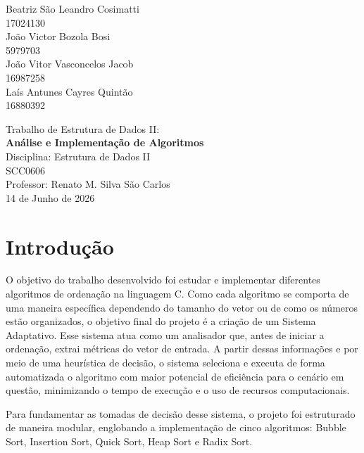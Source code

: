 \documentclass{article}
\begin{document}
\begin{titlepage}
    \centering
    \vspace*{2cm}
    {\large
        Beatriz São Leandro Cosimatti\\
        17024130\\
        João Victor Bozola Bosi\\
        5979703\\
        João Vitor Vasconcelos Jacob\\
        16987258\\
        Laís Antunes Cayres Quintão\\
        16880392\\ 
    }
    \vspace{2cm}
    \vspace{3cm}
    
    {\Large {Trabalho de Estrutura de Dados II:\\}}
    {\Large \textbf{Análise e Implementação de Algoritmos\\}}
    \vspace{3cm}
    {\large
        Disciplina: Estrutura de Dados II\\
        SCC0606\\
        Professor: Renato M. Silva
    }
    \vfill
    {\large
    São Carlos \\ {14 de Junho de 2026}
    }
\end{titlepage}

\tableofcontents
\newpage

\section{Introdução}

    O objetivo do trabalho desenvolvido foi estudar e implementar diferentes algoritmos de ordenação na linguagem C.
    Como cada algoritmo se comporta de uma maneira específica dependendo do tamanho do vetor ou de como os números estão organizados, o objetivo final do projeto é a criação de um Sistema Adaptativo.
    Esse sistema atua como um analisador que, antes de iniciar a ordenação, extrai métricas do vetor de entrada. 
    A partir dessas informações e por meio de uma heurística de decisão, o sistema seleciona e executa de forma automatizada o algoritmo com maior potencial de eficiência para o cenário em questão, minimizando o tempo de execução e o uso de recursos computacionais.

    Para fundamentar as tomadas de decisão desse sistema, o projeto foi estruturado de maneira modular, englobando a implementação de cinco algoritmos: Bubble Sort, Insertion Sort, Quick Sort, Heap Sort e Radix Sort.
\end{document}
